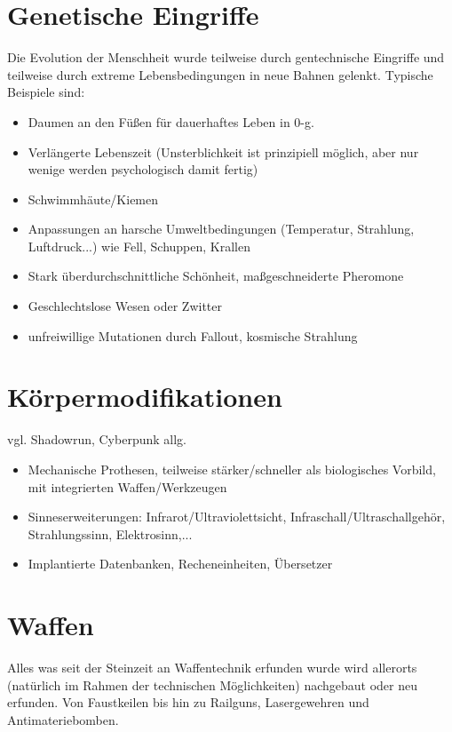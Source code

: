 \documentclass[10pt,a4paper]{report}
\begin{document}
\section{Genetische Eingriffe}
Die Evolution der Menschheit wurde teilweise durch gentechnische Eingriffe und teilweise durch extreme Lebensbedingungen in neue Bahnen gelenkt. Typische Beispiele sind:
\begin{itemize}
\item Daumen an den Füßen für dauerhaftes Leben in 0-g.
\item Verlängerte Lebenszeit (Unsterblichkeit ist prinzipiell möglich, aber nur wenige werden psychologisch damit fertig)
\item Schwimmhäute/Kiemen
\item Anpassungen an harsche Umweltbedingungen (Temperatur, Strahlung, Luftdruck...) wie Fell, Schuppen, Krallen
\item Stark überdurchschnittliche Schönheit, maßgeschneiderte Pheromone
\item Geschlechtslose Wesen oder Zwitter
\item unfreiwillige Mutationen durch Fallout, kosmische Strahlung
\end{itemize}

\section{Körpermodifikationen}
vgl. Shadowrun, Cyberpunk allg.
\begin{itemize}
\item Mechanische Prothesen, teilweise stärker/schneller als biologisches Vorbild, mit integrierten Waffen/Werkzeugen
\item Sinneserweiterungen: Infrarot/Ultraviolettsicht, Infraschall/Ultraschallgehör, Strahlungssinn, Elektrosinn,...
\item Implantierte Datenbanken, Recheneinheiten, Übersetzer
\end{itemize}

\section{Waffen}
Alles was seit der Steinzeit an Waffentechnik erfunden wurde wird allerorts (natürlich im Rahmen der technischen Möglichkeiten) nachgebaut oder neu erfunden. Von Faustkeilen bis hin zu Railguns, Lasergewehren und Antimateriebomben.
\end{document}
